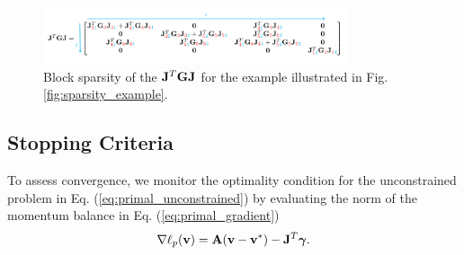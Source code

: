 \begin{figure}[!h]
	\centering
	\includegraphics[width=0.8\textwidth]{figures/JTGJ_schematic.png}
	\caption{\label{fig:JTGJ_schematic} 
	Block sparsity of the ${\mathbf{J}}^T{\mathbf{G}}{\mathbf{J}}$ for the example illustrated in
	Fig. \ref{fig:sparsity_example}.}
\end{figure}



\subsection{Stopping Criteria}
\label{sec:stopping_criteria}

To assess convergence, we monitor the optimality condition for the unconstrained
problem in Eq. (\ref{eq:primal_unconstrained}) by evaluating the norm of the
momentum balance in Eq. (\ref{eq:primal_gradient})
\begin{equation}
	\nabla\ell_p({\mathbf{v}}) = {\mathbf{A}}({\mathbf{v}}-{\mathbf{v}}^*) - {\mathbf{J}}^T{\bm\gamma}.
\end{equation}


